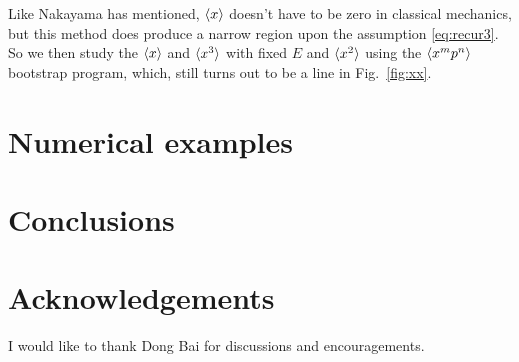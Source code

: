 \documentclass[aps,prl, preprint,amsmath, amssymb]{revtex4-2}
\begin{document}
Like Nakayama has mentioned, $\braket{x}$ doesn't have to be zero in classical mechanics, but this method does produce a narrow region upon the assumption \eqref{eq:recur3}. So we then study the $\braket{x}$ and $\braket{x^3}$ with fixed $E$ and $\braket{x^2}$ using the $\braket{x^m p^n}$ bootstrap program, which, still turns out to be a line in Fig.~\ref{fig:xx}.

\section{Numerical examples}

\section{Conclusions}

\section*{Acknowledgements}
I would like to thank Dong Bai for discussions and encouragements.



%


\end{document}

